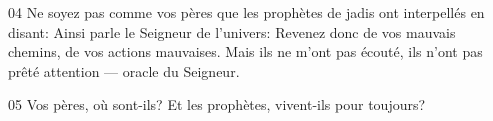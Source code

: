 
04 Ne soyez pas comme vos pères que les prophètes de jadis ont interpellés en disant: Ainsi parle le Seigneur de l’univers: Revenez donc de vos mauvais chemins, de vos actions mauvaises. Mais ils ne m’ont pas écouté, ils n’ont pas prêté attention --- oracle du Seigneur.

05 Vos pères, où sont-ils? Et les prophètes, vivent-ils pour toujours?
